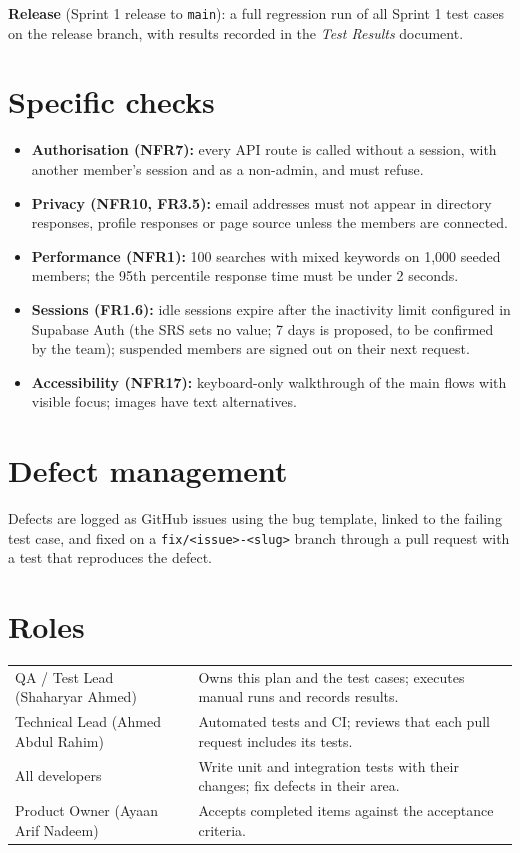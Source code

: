 \documentclass[10pt,a4paper]{article}
\begin{document}
\textbf{Release} (Sprint 1 release to \texttt{main}): a full regression run of all Sprint 1 test cases on the release branch, with results recorded in the \emph{Test Results} document.

\section{Specific checks}
\begin{itemize}
\item \textbf{Authorisation (NFR7):} every API route is called without a session, with another member's session and as a non-admin, and must refuse.
\item \textbf{Privacy (NFR10, FR3.5):} email addresses must not appear in directory responses, profile responses or page source unless the members are connected.
\item \textbf{Performance (NFR1):} 100 searches with mixed keywords on 1,000 seeded members; the 95th percentile response time must be under 2 seconds.
\item \textbf{Sessions (FR1.6):} idle sessions expire after the inactivity limit configured in Supabase Auth (the SRS sets no value; 7 days is proposed, to be confirmed by the team); suspended members are signed out on their next request.
\item \textbf{Accessibility (NFR17):} keyboard-only walkthrough of the main flows with visible focus; images have text alternatives.
\end{itemize}

\section{Defect management}
Defects are logged as GitHub issues using the bug template, linked to the failing test case, and fixed on a \texttt{fix/<issue>-<slug>} branch through a pull request with a test that reproduces the defect.

\section{Roles}
\begin{tabularx}{\linewidth}{@{}l X@{}}
\toprule
QA / Test Lead (Shaharyar Ahmed) & Owns this plan and the test cases; executes manual runs and records results.\\
Technical Lead (Ahmed Abdul Rahim) & Automated tests and CI; reviews that each pull request includes its tests.\\
All developers & Write unit and integration tests with their changes; fix defects in their area.\\
Product Owner (Ayaan Arif Nadeem) & Accepts completed items against the acceptance criteria.\\
\bottomrule
\end{tabularx}
\end{document}

